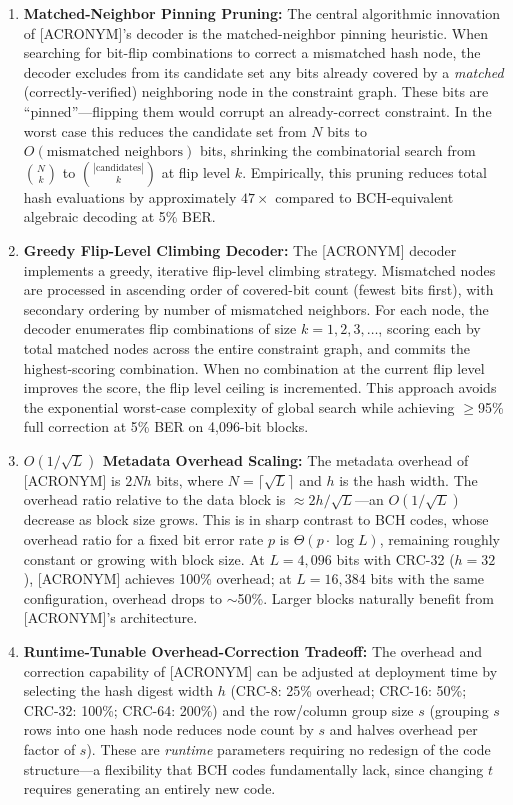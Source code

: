\begin{enumerate}
    \item \textbf{Matched-Neighbor Pinning Pruning:} The central algorithmic innovation of [ACRONYM]'s decoder is the matched-neighbor pinning heuristic. When searching for bit-flip combinations to correct a mismatched hash node, the decoder excludes from its candidate set any bits already covered by a \emph{matched} (correctly-verified) neighboring node in the constraint graph. These bits are ``pinned''---flipping them would corrupt an already-correct constraint. In the worst case this reduces the candidate set from $N$ bits to $O(\text{mismatched neighbors})$ bits, shrinking the combinatorial search from $\binom{N}{k}$ to $\binom{|\text{candidates}|}{k}$ at flip level $k$. Empirically, this pruning reduces total hash evaluations by approximately $47\times$ compared to BCH-equivalent algebraic decoding at 5\% BER.

    \item \textbf{Greedy Flip-Level Climbing Decoder:} The [ACRONYM] decoder implements a greedy, iterative flip-level climbing strategy. Mismatched nodes are processed in ascending order of covered-bit count (fewest bits first), with secondary ordering by number of mismatched neighbors. For each node, the decoder enumerates flip combinations of size $k = 1, 2, 3, \ldots$, scoring each by total matched nodes across the entire constraint graph, and commits the highest-scoring combination. When no combination at the current flip level improves the score, the flip level ceiling is incremented. This approach avoids the exponential worst-case complexity of global search while achieving $\geq$95\% full correction at 5\% BER on 4,096-bit blocks.

    \item \textbf{$O(1/\sqrt{L})$ Metadata Overhead Scaling:} The metadata overhead of [ACRONYM] is $2Nh$ bits, where $N = \lceil\sqrt{L}\rceil$ and $h$ is the hash width. The overhead ratio relative to the data block is $\approx 2h/\sqrt{L}$---an $O(1/\sqrt{L})$ decrease as block size grows. This is in sharp contrast to BCH codes, whose overhead ratio for a fixed bit error rate $p$ is $\Theta(p \cdot \log L)$, remaining roughly constant or growing with block size. At $L = 4{,}096$ bits with CRC-32 ($h = 32$), [ACRONYM] achieves 100\% overhead; at $L = 16{,}384$ bits with the same configuration, overhead drops to $\sim$50\%. Larger blocks naturally benefit from [ACRONYM]'s architecture.

    \item \textbf{Runtime-Tunable Overhead-Correction Tradeoff:} The overhead and correction capability of [ACRONYM] can be adjusted at deployment time by selecting the hash digest width $h$ (CRC-8: 25\% overhead; CRC-16: 50\%; CRC-32: 100\%; CRC-64: 200\%) and the row/column group size $s$ (grouping $s$ rows into one hash node reduces node count by $s$ and halves overhead per factor of $s$). These are \emph{runtime} parameters requiring no redesign of the code structure---a flexibility that BCH codes fundamentally lack, since changing $t$ requires generating an entirely new code.


\end{enumerate}
